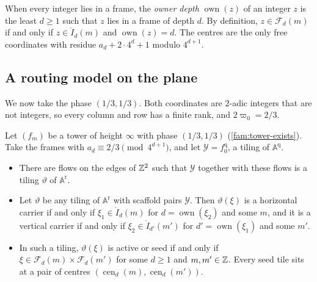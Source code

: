 When every integer lies in a frame, the \emph{owner depth} $\operatorname{own}(z)$ of an integer $z$ is the least $d\ge1$ such that $z$ lies in a frame of depth $d$. By definition, $z\in\mathcal F_d(m)$ if and only if $z\in\mathring I_d(m)$ and $\operatorname{own}(z)=d$. The centres are the only free coordinates with residue $a_d+2\cdot4^d+1$ modulo $4^{d+1}$.

\subsection{A routing model on the plane}\label{fam:sub-positive}

We now take the phase $(1/3,1/3)$. Both coordinates are $2$-adic integers that are not integers, so every column and row has a finite rank, and $2\varpi_0=2/3$.

\begin{lemma}\label{fam:positive}
Let $(f_m)$ be a tower of height $\infty$ with phase $(1/3,1/3)$ (\cref{fam:tower-exists}). Take the frames with $a_d\equiv2/3\pmod{4^{d+1}}$, and let $\mathcal Y=f_0^{\mathrm q}$, a tiling of $\mathbb A^{\mathrm q}$.
\begin{itemize}
\item[(a)] There are flows on the edges of $\mathbb{Z}^2$ such that $\mathcal Y$ together with these flows is a tiling $\vartheta$ of $\mathbb A^{\mathrm r}$.
\item[(b)] Let $\vartheta$ be any tiling of $\mathbb A^{\mathrm r}$ with scaffold pairs $\mathcal Y$. Then $\vartheta(\xi)$ is a horizontal carrier if and only if $\xi_1\in\mathring I_d(m)$ for $d=\operatorname{own}(\xi_2)$ and some $m$, and it is a vertical carrier if and only if $\xi_2\in\mathring I_{d'}(m')$ for $d'=\operatorname{own}(\xi_1)$ and some $m'$.
\item[(c)] In such a tiling, $\vartheta(\xi)$ is active or seed if and only if $\xi\in\mathcal F_d(m)\times\mathcal F_d(m')$ for some $d\ge1$ and $m,m'\in\mathbb{Z}$. Every seed tile sits at a pair of centres $(\operatorname{cen}_d(m),\operatorname{cen}_d(m'))$.
\end{itemize}
\end{lemma}

